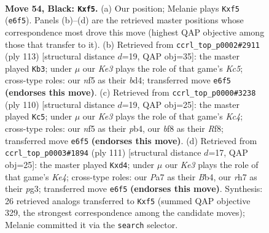 \documentclass[11pt]{article}
\begin{document}
\clearpage

\begin{figure}[p]\centering
\begin{subfigure}{0.46\textwidth}\centering
\resizebox{\linewidth}{!}{%
\newchessgame
\chessboard[
  setfen={5B2/p6R/P3k3/1P3Nb1/3K4/8/8/8 b - - 0 54},
  showmover=false,
  pgfstyle=straightmove, color=movearrow, markmove={e6-f5}
]}
\caption{}
\end{subfigure}\hfill
\begin{subfigure}{0.46\textwidth}\centering
\resizebox{\linewidth}{!}{%
\newchessgame
\chessboard[
  setfen={8/8/8/pN6/P1kB1b2/8/4K3/8 b - - 6 57},
  showmover=false,
  pgfstyle=straightmove, color=movearrow, markmove={c4-b3}
]}
\caption{}
\end{subfigure}
\\[4pt]
\begin{subfigure}{0.46\textwidth}\centering
\resizebox{\linewidth}{!}{%
\newchessgame
\chessboard[
  setfen={5R2/8/8/8/1pK5/2n5/2B1k3/r7 w - - 26 56},
  showmover=false,
  pgfstyle=straightmove, color=movearrow, markmove={c4-c5}
]}
\caption{}
\end{subfigure}\hfill
\begin{subfigure}{0.46\textwidth}\centering
\resizebox{\linewidth}{!}{%
\newchessgame
\chessboard[
  setfen={8/8/7p/4k3/1b1N4/5KPP/8/1B6 b - - 0 56},
  showmover=false,
  pgfstyle=straightmove, color=movearrow, markmove={e5-d4}
]}
\caption{}
\end{subfigure}
\caption{\textbf{Move 54, Black: \texttt{Kxf5}.} (a) Our position; Melanie plays \texttt{Kxf5} (\texttt{e6f5}). Panels (b)--(d) are the retrieved master positions whose correspondence most drove this move (highest QAP objective among those that transfer to it). (b) Retrieved from \texttt{ccrl\_top\_p0002\#2911} (ply 113) [structural distance $d$=19, QAP obj=35]: the master played \texttt{Kb3}; under $\mu$ our \emph{Ke3} plays the role of that game's \emph{Kc5}; cross-type roles: our \emph{n}f5 as their \emph{b}d4; transferred move \texttt{e6f5} \textbf{(endorses this move)}. (c) Retrieved from \texttt{ccrl\_top\_p0000\#3238} (ply 110) [structural distance $d$=19, QAP obj=25]: the master played \texttt{Kc5}; under $\mu$ our \emph{Ke3} plays the role of that game's \emph{Kc4}; cross-type roles: our \emph{n}f5 as their \emph{p}b4, our \emph{b}f8 as their \emph{R}f8; transferred move \texttt{e6f5} \textbf{(endorses this move)}. (d) Retrieved from \texttt{ccrl\_top\_p0003\#1894} (ply 111) [structural distance $d$=17, QAP obj=25]: the master played \texttt{Kxd4}; under $\mu$ our \emph{Ke3} plays the role of that game's \emph{Ke4}; cross-type roles: our \emph{P}a7 as their \emph{B}b4, our \emph{r}h7 as their \emph{p}g3; transferred move \texttt{e6f5} \textbf{(endorses this move)}. Synthesis: 26 retrieved analogs transferred to \texttt{Kxf5} (summed QAP objective 329, the strongest correspondence among the candidate moves); Melanie committed it via the \texttt{search} selector.}
\label{fig:thought-m107}
\end{figure}
\end{document}
